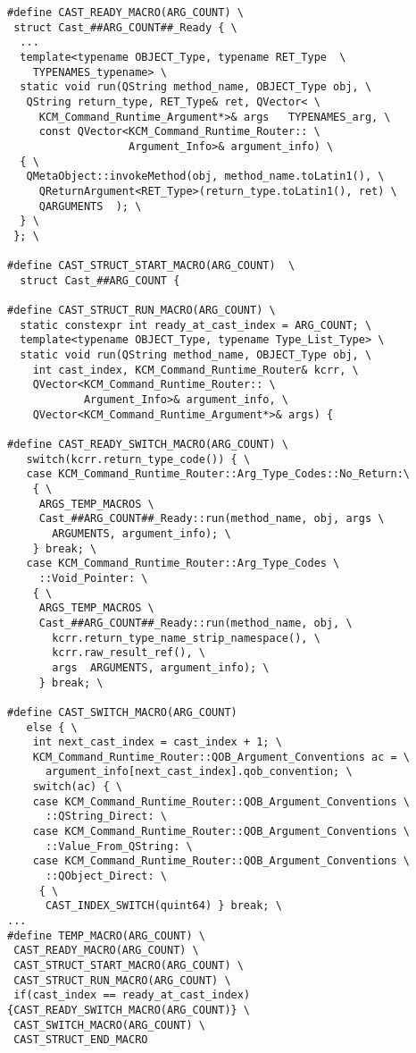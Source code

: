 \begin{lstlisting}
#define CAST_READY_MACRO(ARG_COUNT) \
 struct Cast_##ARG_COUNT##_Ready { \
  ...
  template<typename OBJECT_Type, typename RET_Type  \
    TYPENAMES_typename> \
  static void run(QString method_name, OBJECT_Type obj, \
   QString return_type, RET_Type& ret, QVector< \
     KCM_Command_Runtime_Argument*>& args   TYPENAMES_arg, \
     const QVector<KCM_Command_Runtime_Router:: \
                   Argument_Info>& argument_info) \
  { \
   QMetaObject::invokeMethod(obj, method_name.toLatin1(), \
     QReturnArgument<RET_Type>(return_type.toLatin1(), ret) \
     QARGUMENTS  ); \
  } \
 }; \
 
#define CAST_STRUCT_START_MACRO(ARG_COUNT)  \
  struct Cast_##ARG_COUNT { 

#define CAST_STRUCT_RUN_MACRO(ARG_COUNT) \
  static constexpr int ready_at_cast_index = ARG_COUNT; \
  template<typename OBJECT_Type, typename Type_List_Type> \
  static void run(QString method_name, OBJECT_Type obj, \
    int cast_index, KCM_Command_Runtime_Router& kcrr, \
    QVector<KCM_Command_Runtime_Router:: \
            Argument_Info>& argument_info, \
    QVector<KCM_Command_Runtime_Argument*>& args) { 

#define CAST_READY_SWITCH_MACRO(ARG_COUNT) \
   switch(kcrr.return_type_code()) { \
   case KCM_Command_Runtime_Router::Arg_Type_Codes::No_Return:\
    { \
     ARGS_TEMP_MACROS \
     Cast_##ARG_COUNT##_Ready::run(method_name, obj, args \
       ARGUMENTS, argument_info); \
    } break; \
   case KCM_Command_Runtime_Router::Arg_Type_Codes \
     ::Void_Pointer: \
    { \
     ARGS_TEMP_MACROS \
     Cast_##ARG_COUNT##_Ready::run(method_name, obj, \
       kcrr.return_type_name_strip_namespace(), \
       kcrr.raw_result_ref(), \
       args  ARGUMENTS, argument_info); \
     } break; \
 
#define CAST_SWITCH_MACRO(ARG_COUNT)                 
   else { \
    int next_cast_index = cast_index + 1; \
    KCM_Command_Runtime_Router::QOB_Argument_Conventions ac = \
      argument_info[next_cast_index].qob_convention; \
    switch(ac) { \
    case KCM_Command_Runtime_Router::QOB_Argument_Conventions \
      ::QString_Direct: \
    case KCM_Command_Runtime_Router::QOB_Argument_Conventions \
      ::Value_From_QString: \
    case KCM_Command_Runtime_Router::QOB_Argument_Conventions \
      ::QObject_Direct: \
     { \
      CAST_INDEX_SWITCH(quint64) } break; \
...
#define TEMP_MACRO(ARG_COUNT) \
 CAST_READY_MACRO(ARG_COUNT) \
 CAST_STRUCT_START_MACRO(ARG_COUNT) \
 CAST_STRUCT_RUN_MACRO(ARG_COUNT) \
 if(cast_index == ready_at_cast_index) {CAST_READY_SWITCH_MACRO(ARG_COUNT)} \
 CAST_SWITCH_MACRO(ARG_COUNT) \
 CAST_STRUCT_END_MACRO


\end{lstlisting}

